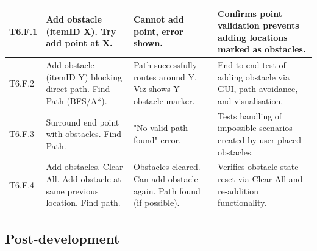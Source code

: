 \begin{longtable}{|p{}|p{}|p{}|p{}|}
T6.F.1 & Add obstacle (itemID X). Try add point at X. & Cannot add point, error shown. & Confirms point validation prevents adding locations marked as obstacles. \\
\hline
T6.F.2 & Add obstacle (itemID Y) blocking direct path. Find Path (BFS/A*). & Path successfully routes around Y. Viz shows Y obstacle marker. & End-to-end test of adding obstacle via GUI, path avoidance, and visualisation. \\
\hline
T6.F.3 & Surround end point with obstacles. Find Path. & "No valid path found" error. & Tests handling of impossible scenarios created by user-placed obstacles. \\
\hline
T6.F.4 & Add obstacles. Clear All. Add obstacle at same previous location. Find path. & Obstacles cleared. Can add obstacle again. Path found (if possible). & Verifies obstacle state reset via Clear All and re-addition functionality. \\
\hline
\end{longtable}

\newpage

\subsection{Post-development}

